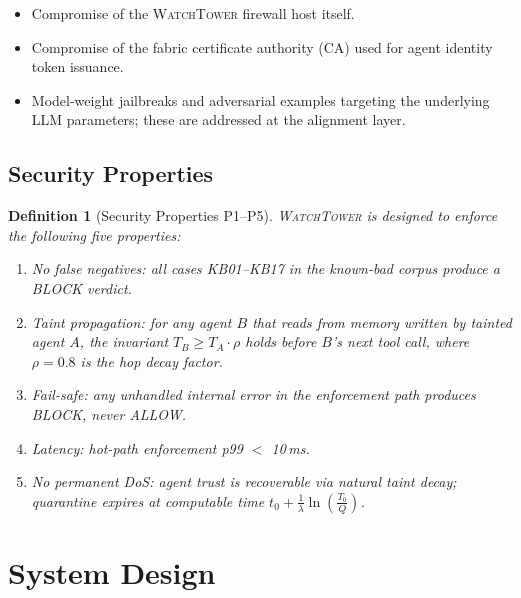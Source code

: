 \documentclass[conference]{IEEEtran}
\newtheorem{definition}{Definition}
\begin{document}
\begin{itemize}
\item Compromise of the \textsc{WatchTower} firewall host itself.
\item Compromise of the fabric certificate authority (CA) used for
      agent identity token issuance.
\item Model-weight jailbreaks and adversarial examples targeting the
      underlying LLM parameters; these are addressed at the alignment layer.
\end{itemize}

\subsection{Security Properties}

\begin{definition}[Security Properties P1--P5]
\textsc{WatchTower} is designed to enforce the following five properties:

\begin{enumerate}

\item[\textbf{P1}] \textit{No false negatives}: all cases KB01--KB17 in
      the known-bad corpus produce a BLOCK verdict.

\item[\textbf{P2}] \textit{Taint propagation}: for any agent $B$ that
      reads from memory written by tainted agent $A$, the invariant
      $T_B \geq T_A \cdot \rho$ holds before $B$'s next tool call,
      where $\rho = 0.8$ is the hop decay factor.

\item[\textbf{P3}] \textit{Fail-safe}: any unhandled internal error in
      the enforcement path produces BLOCK, never ALLOW.

\item[\textbf{P4}] \textit{Latency}: hot-path enforcement p99 $<$ 10\,ms.

\item[\textbf{P5}] \textit{No permanent DoS}: agent trust is recoverable
      via natural taint decay; quarantine expires at computable time
      $t_0 + \frac{1}{\lambda}\ln\!\left(\frac{T_0}{Q}\right)$.

\end{enumerate}
\end{definition}

\section{System Design}
\label{sec:design}
\end{document}

